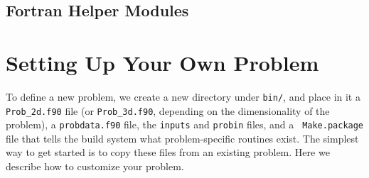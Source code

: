 \subsection{Fortran Helper Modules}


\section{Setting Up Your Own Problem}

To define a new problem, we create a new directory under {\tt bin/},
and place in it a {\tt Prob\_2d.f90} file (or {\tt Prob\_3d.f90},
depending on the dimensionality of the problem), a {\tt probdata.f90}
file, the {\tt inputs} and {\tt probin} files, and a {\tt
  Make.package} file that tells the build system what problem-specific
routines exist.  The
simplest way to get started is to copy these files from an existing
problem.  Here we describe how to customize your problem.

